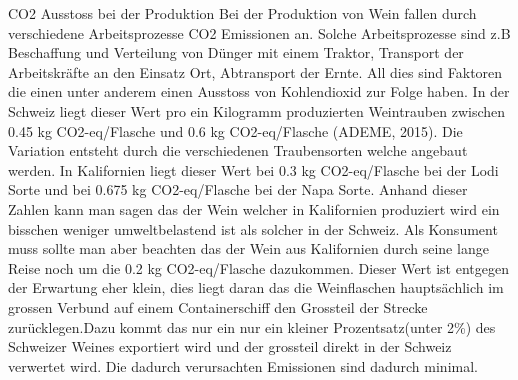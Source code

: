 CO2 Ausstoss bei der Produktion
Bei der Produktion von Wein fallen durch verschiedene Arbeitsprozesse CO2 Emissionen an. Solche Arbeitsprozesse sind z.B Beschaffung und Verteilung von Dünger mit einem Traktor, Transport der Arbeitskräfte an den Einsatz Ort, Abtransport der Ernte. All dies sind Faktoren die einen unter anderem einen Ausstoss von Kohlendioxid zur Folge haben. In der Schweiz liegt dieser Wert pro ein Kilogramm produzierten Weintrauben zwischen 0.45 kg CO2-eq/Flasche und 0.6 kg CO2-eq/Flasche (ADEME, 2015). Die Variation entsteht durch die verschiedenen Traubensorten welche angebaut werden. In Kalifornien liegt dieser Wert bei 0.3 kg CO2-eq/Flasche bei der Lodi Sorte und bei 0.675 kg CO2-eq/Flasche bei der Napa Sorte.
Anhand dieser Zahlen kann man sagen das der Wein welcher in Kalifornien produziert wird ein bisschen weniger umweltbelastend ist als solcher in der Schweiz. Als Konsument muss sollte man aber beachten das der Wein aus Kalifornien durch seine lange Reise noch um die 0.2 kg CO2-eq/Flasche dazukommen. Dieser Wert ist entgegen der Erwartung eher klein, dies liegt daran das die Weinflaschen hauptsächlich im grossen Verbund auf einem Containerschiff den Grossteil der Strecke zurücklegen.Dazu kommt das nur ein nur ein kleiner Prozentsatz(unter 2\%) des Schweizer Weines exportiert wird und der grossteil direkt in der Schweiz verwertet wird. Die dadurch verursachten Emissionen sind dadurch minimal. 